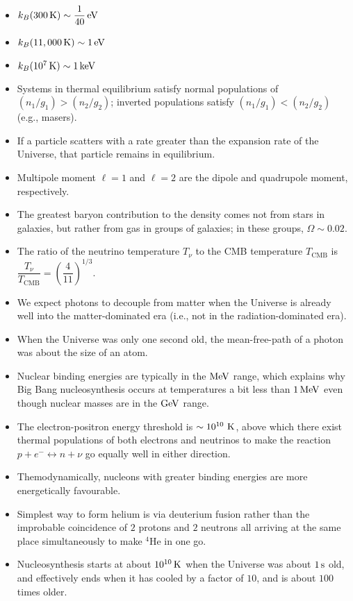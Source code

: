 \documentclass[a4paper,11pt]{article}
\begin{document}
\begin{itemize}
    \item $k_B(300\,\mathrm{K}) \sim \dfrac{1}{40}\,{\rm eV}$
    \item $k_B(11,000\,\mathrm{K}) \sim 1\,{\rm eV}$
    \item $k_B(10^7\,\mathrm{K}) \sim 1\,{\rm keV}$
    \item Systems in thermal equilibrium satisfy normal populations of $(n_1/g_1)>(n_2/g_2)$; inverted populations satisfy $(n_1/g_1)<(n_2/g_2)$ (e.g., masers).
    \item If a particle scatters with a rate greater than the expansion rate of the Universe, that particle remains in equilibrium.
    \item Multipole moment $\ell=1$ and $\ell=2$ are the dipole and quadrupole moment, respectively.
    \item The greatest baryon contribution to the density comes not from stars in galaxies, but rather from gas in groups of galaxies; in these groups, $\Omega\sim0.02$.
    \item The ratio of the neutrino temperature $T_\nu$ to the CMB temperature $T_\mathrm{CMB}$ is $\dfrac{T_\nu}{T_\mathrm{CMB}} = \left( \dfrac{4}{11} \right)^{1/3}$.
    \item We expect photons to decouple from matter when the Universe is already well into the matter-dominated era (i.e., not in the radiation-dominated era).
    \item When the Universe was only one second old, the mean-free-path of a photon was about the size of an atom.
    \item Nuclear binding energies are typically in the $\rm{MeV}$ range, which explains why Big Bang nucleosynthesis occurs at temperatures a bit less than $1\,\rm{MeV}$ even though nuclear masses are in the $\rm{GeV}$ range.
    \item The electron-positron energy threshold is $\sim10^{10}~{\rm K}$, above which there exist thermal populations of both electrons and neutrinos to make the reaction $p+e^-\leftrightarrow n+\nu$ go equally well in either direction.
    \item Themodynamically, nucleons with greater binding energies are more energetically favourable.
    \item Simplest way to form helium is via deuterium fusion rather than the improbable coincidence of $2$ protons and $2$ neutrons all arriving at the same place simultaneously to make $^4$He in one go.
    \item Nucleosynthesis starts at about $10^{10}\,{\rm K}$ when the Universe was about $1\,{\rm s}$ old, and effectively ends when it has cooled by a factor of $10$, and is about $100$ times older.

\end{itemize}
\end{document}
